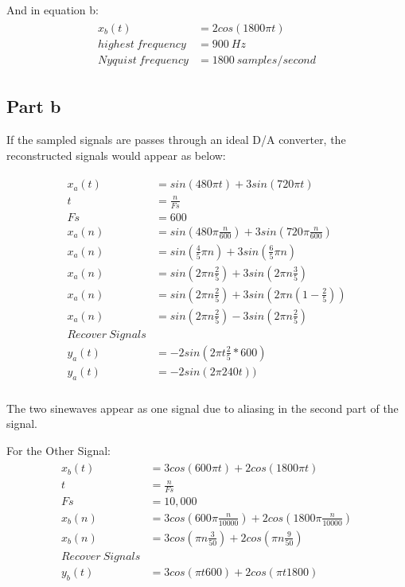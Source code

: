 \documentclass[paper=letterpaper, fontsize=11pt]{scrartcl} %
\numberwithin{equation}{section} %
\numberwithin{figure}{section} %
\numberwithin{table}{section} %
\begin{document}
	And in equation b:
	\begin{align}
	\begin{split}
		x_{b}(t)	&= 2cos(1800 \pi t)\\
		highest \:  frequency &= 900 \: Hz\\
		Nyquist \:  frequency &= 1800 \: samples/second
	\end{split}
	\end{align}

\subsection{Part b}
	If the sampled signals are passes through an ideal D/A converter, the reconstructed
	signals would appear as below:

	\begin{align}
	\begin{split}
		x_{a}(t)	&= sin(480 \pi t) + 3sin(720 \pi t)\\
		t &= \frac{n}{Fs} \\
		Fs &= 600 \\
		x_{a}(n) &= sin(480 \pi \frac{n}{600}) + 3sin(720 \pi \frac{n}{600}) \\
		x_{a}(n) &= sin(\frac{4}{5} \pi n) + 3sin(\frac{6}{5} \pi n) \\
		x_{a}(n) &= sin(2 \pi n \frac{2}{5}) + 3sin(2 \pi n \frac{3}{5}) \\
		x_{a}(n) &= sin(2 \pi n \frac{2}{5}) + 3sin(2 \pi n (1 - \frac{2}{5})) \\
		x_{a}(n) &= sin(2 \pi n \frac{2}{5}) - 3 sin(2 \pi n \frac{2}{5}) \\
		Recover \: Signals \\
		y_{a}(t) &= -2sin(2 \pi t \frac{2}{5} * 600)\\
		y_{a}(t) &= -2sin(2 \pi 240 t)) \\
	\end{split}
	\end{align}

	The two sinewaves appear as one signal due to aliasing in the second part of the signal. 

	For the Other Signal:
	\begin{align}
	\begin{split}
		x_{b}(t)	&= 3cos(600 \pi t) + 2cos(1800 \pi t) \\
		t &= \frac{n}{Fs} \\
		Fs &= 10,000 \\
		x_{b}(n) &= 3 cos(600 \pi \frac{n}{10000}) + 2cos(1800 \pi \frac{n}{10000}) \\
		x_{b}(n) &= 3 cos(\pi n \frac{3}{50}) + 2 cos(\pi n \frac{9}{50}) \\
		Recover \: Signals \\
		y_{b}(t) &= 3 cos(\pi t 600) + 2 cos(\pi t 1800) \\
	\end{split}
	\end{align}
\end{document}
